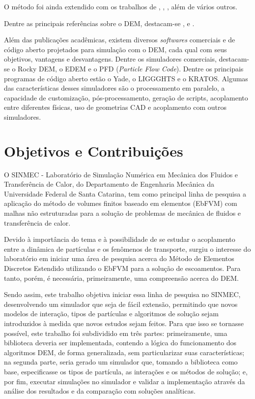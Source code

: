 O método foi ainda extendido com os trabalhos de , , , além de vários outros.

Dentre as principais referências sobre o DEM, destacam-se ,  e .

Além das publicações acadêmicas, existem diversos \textit{softwares} comerciais e de código aberto projetados para simulação com o DEM, cada qual com seus objetivos, vantagens e desvantagens. Dentre os simuladores comerciais, destacam-se o Rocky DEM, o EDEM e o PFD (\textit{Particle Flow Code}). Dentre os principais programas de código aberto estão o Yade, o LIGGGHTS e o KRATOS. Algumas das características desses simuladores são o processamento em paralelo, a capacidade de customização, pós-processamento, geração de scripts, acoplamento entre diferentes físicas, uso de geometrias CAD e acoplamento com outros simuladores.

\section{Objetivos e Contribuições}

O SINMEC - Laboratório de Simulação Numérica em Mecânica dos Fluidos e Transferência de Calor, do Departamento de Engenharia Mecânica da Universidade Federal de Santa Catarina, tem como principal linha de pesquisa a aplicação do método de volumes finitos baseado em elementos (EbFVM) com malhas não estruturadas para a solução de problemas de mecânica de fluidos e transferência de calor.

Devido à importância do tema e à possibilidade de se estudar o acoplamento entre a dinâmica de partículas e os fenômenos de transporte, surgiu o interesse do laboratório em iniciar uma área de pesquisa acerca do Método de Elementos Discretos Estendido utilizando o EbFVM para a solução de escoamentos. Para tanto, porém, é necessária, primeiramente, uma compreensão acerca do DEM.

Sendo assim, este trabalho objetiva iniciar essa linha de pesquisa no SINMEC, desenvolvendo um simulador que seja de fácil extensão, permitindo que novos modelos de interação, tipos de partículas e algoritmos de solução sejam introduzidos à medida que novos estudos sejam feitos. Para que isso se tornasse possível, este trabalho foi subdividido em três partes: primeiramente, uma biblioteca deveria ser implementada, contendo a lógica do funcionamento dos algoritmos DEM, de forma generalizada, sem particularizar suas características; na segunda parte, seria gerado um simulador que, tomando a biblioteca como base, especificasse os tipos de partícula, as interações e os métodos de solução; e, por fim, executar simulações no simulador e validar a implementação através da análise dos resultados e da comparação com soluções analíticas. 
 
